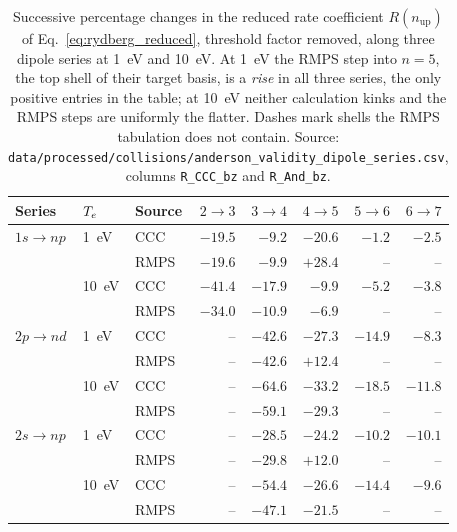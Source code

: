 \begin{table}[tbp]
  \centering
  \caption[Rydberg-series test of the $n=5$ disagreement]{Successive percentage
  changes in the reduced rate coefficient $R(n_{\mathrm{up}})$ of
  Eq.~\eqref{eq:rydberg_reduced}, threshold factor removed, along three dipole
  series at \SI{1}{\electronvolt} and \SI{10}{\electronvolt}. At
  \SI{1}{\electronvolt} the RMPS step into $n=5$, the top shell of their
  target basis, is a \emph{rise} in all three series, the only positive
  entries in the table; at \SI{10}{\electronvolt} neither calculation kinks
  and the RMPS steps are uniformly the flatter. Dashes mark shells the RMPS
  tabulation does not contain. Source:
  \texttt{data/processed/collisions/anderson\_validity\_dipole\_series.csv},
  columns \texttt{R\_CCC\_bz} and \texttt{R\_And\_bz}.}
  \label{tab:rydberg}
  \begin{tabular}{lllrrrrr}
    \toprule
    Series & $T_e$ & Source & $2\!\to\!3$ & $3\!\to\!4$ & $4\!\to\!5$ & $5\!\to\!6$ & $6\!\to\!7$ \\
    \midrule
    $1s \to np$ & \SI{1}{\electronvolt}  & CCC  & $-19.5$ & $-9.2$  & $-20.6$          & $-1.2$  & $-2.5$ \\
                &                        & RMPS & $-19.6$ & $-9.9$  & $\mathbf{+28.4}$ & --      & -- \\
                & \SI{10}{\electronvolt} & CCC  & $-41.4$ & $-17.9$ & $-9.9$           & $-5.2$  & $-3.8$ \\
                &                        & RMPS & $-34.0$ & $-10.9$ & $-6.9$           & --      & -- \\
    \midrule
    $2p \to nd$ & \SI{1}{\electronvolt}  & CCC  & --      & $-42.6$ & $-27.3$          & $-14.9$ & $-8.3$ \\
                &                        & RMPS & --      & $-42.6$ & $\mathbf{+12.4}$ & --      & -- \\
                & \SI{10}{\electronvolt} & CCC  & --      & $-64.6$ & $-33.2$          & $-18.5$ & $-11.8$ \\
                &                        & RMPS & --      & $-59.1$ & $-29.3$          & --      & -- \\
    \midrule
    $2s \to np$ & \SI{1}{\electronvolt}  & CCC  & --      & $-28.5$ & $-24.2$          & $-10.2$ & $-10.1$ \\
                &                        & RMPS & --      & $-29.8$ & $\mathbf{+12.0}$ & --      & -- \\
                & \SI{10}{\electronvolt} & CCC  & --      & $-54.4$ & $-26.6$          & $-14.4$ & $-9.6$ \\
                &                        & RMPS & --      & $-47.1$ & $-21.5$          & --      & -- \\
    \bottomrule
  \end{tabular}
\end{table}

